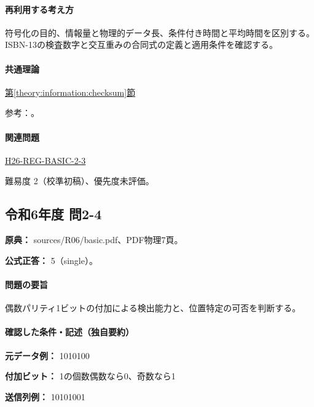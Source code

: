 \paragraph{再利用する考え方} 符号化の目的、情報量と物理的データ長、条件付き時間と平均時間を区別する。ISBN-13の検査数字と交互重みの合同式の定義と適用条件を確認する。

\paragraph{共通理論} \hyperref[theory:information:checksum]{第\ref*{theory:information:checksum}節}

\par 参考：\cite{info_isbn}。

\paragraph{関連問題} \hyperref[q:h26-reg-basic-2-3]{H26-REG-BASIC-2-3}

\par 難易度 2（校準初稿）、優先度未評価。

\subsection{令和6年度 問2-4}
\label{q:r06-reg-basic-2-4}

\noindent\textbf{原典：} sources/R06/basic.pdf、PDF物理7頁。

\textbf{公式正答：} 5（single）。

\paragraph{問題の要旨} 偶数パリティ1ビットの付加による検出能力と、位置特定の可否を判断する。

\paragraph{確認した条件・記述（独自要約）}\mbox{}\par

\noindent\textbf{元データ例：} 1010100\par

\noindent\textbf{付加ビット：} 1の個数偶数なら0、奇数なら1\par

\noindent\textbf{送信列例：} 10101001\par

